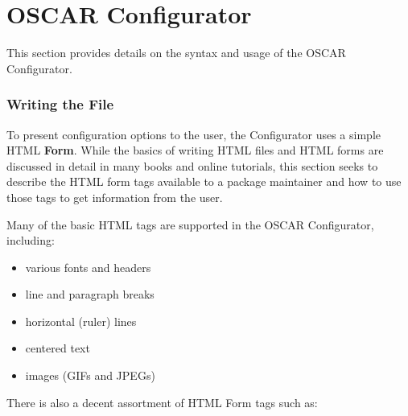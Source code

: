%
%


\section{OSCAR Configurator}
\label{sect:configurator}

This section provides details on the syntax and usage of the OSCAR
Configurator. 

\subsubsection*{Writing the  File}

To present configuration options to the user, the Configurator uses
a simple HTML \textbf{Form}. While the basics of writing HTML files
and HTML forms are discussed in detail in many books and online tutorials,
this section seeks to describe the HTML form tags available to a package
maintainer and how to use those tags to get information from the user.

Many of the basic HTML tags are supported in the OSCAR Configurator,
including:

\begin{itemize}
	\item various fonts and headers 
	\item line and paragraph breaks 
	\item horizontal (ruler) lines 
	\item centered text 
	\item images (GIFs and JPEGs) 
\end{itemize}
There is also a decent assortment of HTML Form tags such as:

